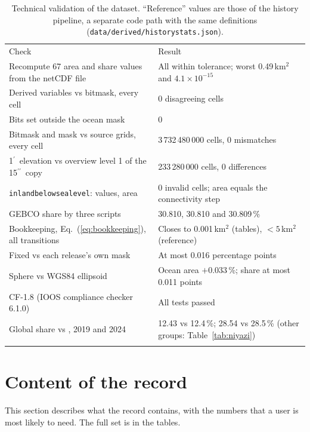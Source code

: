 \documentclass[essd, manuscript]{copernicus}
\newcommand{\as}{$^{\prime\prime}$}      %
\newcommand{\am}{$^{\prime}$}            %
\renewcommand{\_}{\usorig\allowbreak}
\begin{document}
\begin{table}[t]
\caption{Technical validation of the dataset. ``Reference'' values are those of the history pipeline, a separate code path with the same definitions (\texttt{data/derived/history\_stats.json}).}
\label{tab:validation}
\small
\begin{tabular}{p{}p{}}
\tophline
Check & Result \\
\middlehline
Recompute 67 area and share values from the netCDF file & All within tolerance; worst 0.49\,km$^2$ and $4.1 \times 10^{-15}$ \\
Derived variables vs bitmask, every cell & 0 disagreeing cells \\
Bits set outside the ocean mask & 0 \\
Bitmask and mask vs source grids, every cell & 3\,732\,480\,000 cells, 0 mismatches \\
1\am\ elevation vs overview level 1 of the 15\as\ copy & 233\,280\,000 cells, 0 differences \\
\texttt{inland\_below\_sea\_level}: values, area & 0 invalid cells; area equals the connectivity step \\
GEBCO\_2026 share by three scripts & 30.810, 30.810 and 30.809\,\% \\
Bookkeeping, Eq.~(\ref{eq:bookkeeping}), all transitions & Closes to 0.001\,km$^2$ (tables), $< 5$\,km$^2$ (reference) \\
Fixed vs each release's own mask & At most 0.016 percentage points \\
Sphere vs WGS84 ellipsoid & Ocean area $+0.033$\,\%; share at most 0.011 points \\
CF-1.8 (IOOS compliance checker 6.1.0) & All tests passed \\
Global share vs \citet{niyazi2025}, 2019 and 2024 & 12.43 vs 12.4\,\%; 28.54 vs 28.5\,\% (other groups: Table~\ref{tab:niyazi}) \\
\bottomhline
\end{tabular}
\end{table}

\section{Content of the record}
\label{sec:content}

This section describes what the record contains, with the numbers that a user is most likely to need.
The full set is in the tables.
\end{document}
